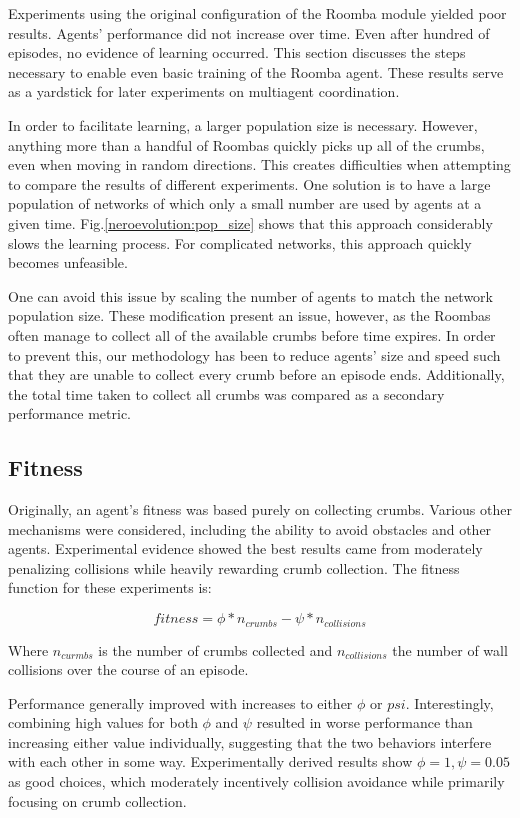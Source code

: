 \documentclass[conference]{IEEEtran}
\begin{document}
Experiments using the original configuration of the Roomba module yielded poor results. Agents' performance did not increase over time.  Even after hundred of episodes, no evidence of learning occurred. This section discusses the steps necessary to enable even basic training of the Roomba agent. These results serve as a yardstick for later experiments on multiagent coordination.

In order to facilitate learning, a larger population size is necessary. 
However, anything more than a handful of Roombas quickly picks up all of the crumbs, even when moving in random directions. This creates difficulties when attempting to compare the results of different experiments.
One solution is to have a large population of networks of which only a small number are used by agents at a given time. Fig.\ref{neroevolution:pop_size} shows that this approach considerably slows the learning process. For complicated networks, this approach quickly becomes unfeasible.

One can avoid this issue by scaling the number of agents to match the network population size. These modification present an issue, however, as the Roombas often manage to collect all of the available crumbs before time expires. In order to prevent this, our methodology has been to reduce agents' size and speed such that they are unable to collect every crumb before an episode ends. Additionally, the total time taken to collect all crumbs was compared as a secondary performance metric.


\subsection{Fitness}
Originally, an agent's fitness was based purely on collecting crumbs. Various other mechanisms were considered, including the ability to avoid obstacles and other agents. Experimental evidence showed the best results came from moderately penalizing collisions while heavily rewarding crumb collection. The fitness function for these experiments is:


\[ fitness = \phi * n_{crumbs} - \psi * n_{collisions}\]

Where $n_{curmbs}$ is the number of crumbs collected and $n_{collisions}$ the number of wall collisions over the course of an episode. 
 
Performance generally improved with increases to either $\phi$ or $psi$.
Interestingly, combining high values for both $\phi$ and $\psi$ resulted in worse performance than increasing either value individually, suggesting that the two behaviors interfere with each other in some way. 
Experimentally derived results show $\phi = 1, \psi = 0.05$ as good choices, which moderately incentively collision avoidance while primarily focusing on crumb collection. 
\end{document}

